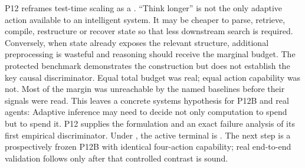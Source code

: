 \markdownRendererDocumentBegin
\markdownRendererSectionBegin
{}\markdownRendererInterblockSeparator
{}P12 reframes test-time scaling as a . “Think longer” is not the only adaptive action available to an intelligent system. It may be cheaper to parse, retrieve, compile, restructure or recover state so that less downstream search is required. Conversely, when state already exposes the relevant structure, additional preprocessing is wasteful and reasoning should receive the marginal budget.\markdownRendererInterblockSeparator
{}The protected benchmark demonstrates the construction but does not establish the key causal discriminator. Equal total budget was real; equal action capability was not. Most of the margin was unreachable by the named baselines before their signals were read.\markdownRendererInterblockSeparator
{}This leaves a concrete systems hypothesis for P12B and real agents: \markdownRendererInterblockSeparator
{}Adaptive inference may need to decide not only  computation to spend but  to spend it. P12 supplies the formulation and an exact failure analysis of its first empirical discriminator. Under , the active terminal is . The next step is a prospectively frozen P12B with identical four-action capability; real end-to-end validation follows only after that controlled contrast is sound.
\markdownRendererSectionEnd \markdownRendererDocumentEnd